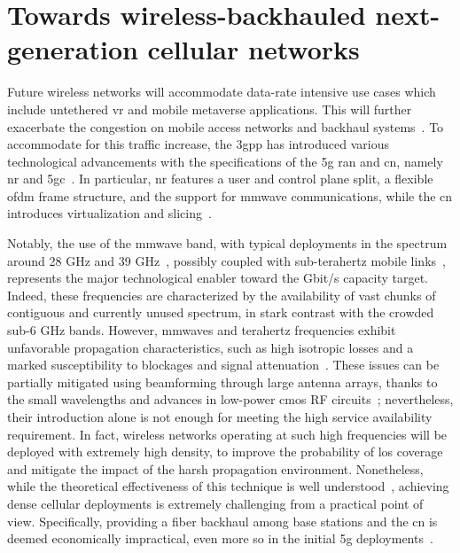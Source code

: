 \chapter{Towards wireless-backhauled next-generation cellular networks}
\label{ch:iab}


Future wireless networks will accommodate data-rate intensive use cases which include untethered \gls{vr} and mobile metaverse applications. This will further exacerbate the congestion on mobile access networks and backhaul systems~\cite{holo1}.
To accommodate for this traffic increase, the \gls{3gpp} has introduced various technological advancements with the specifications of the \gls{5g} \gls{ran} and \gls{cn}, namely \gls{nr} and \gls{5gc}~\cite{3gpp_38_300}. In particular, \gls{nr} features a user and control plane split, a flexible \gls{ofdm} frame structure, and the support for \gls{mmwave} communications, while the \gls{cn} introduces virtualization and slicing~\cite{yousaf2017nfv}. 

Notably, the use of the \gls{mmwave} band, with typical deployments in the spectrum around 28 GHz and 39 GHz~\cite{shafi2017deployment}, possibly coupled with sub-terahertz mobile links~\cite{polese2020toward, 8869705}, represents the major technological enabler toward the Gbit/s capacity target. Indeed, these frequencies are characterized by the availability of vast chunks of contiguous and currently unused spectrum, in stark contrast with the crowded sub-6 GHz bands. 
However, \glspl{mmwave} and terahertz frequencies exhibit unfavorable propagation characteristics, such as high isotropic losses and a marked susceptibility to blockages and signal attenuation~\cite{khan2011mmwave, rangan2014millimeter}.
These issues can be partially mitigated using beamforming through large antenna arrays, thanks to the small wavelengths and advances in low-power \gls{cmos} RF circuits~\cite{hemadeh2017millimeter}; nevertheless, their introduction alone is not enough for meeting the high service availability requirement. 
In fact, wireless networks operating at such high frequencies will be deployed with extremely high density, to improve the probability of \gls{los} coverage and mitigate the impact of the harsh propagation environment. 
Nonetheless, while the theoretical effectiveness of this technique is well understood~\cite{gomez2017capacity}, achieving dense cellular deployments is extremely challenging from a practical point of view. Specifically, providing a fiber backhaul among base stations and the \gls{cn} is deemed economically impractical, even more so in the initial \gls{5g} deployments~\cite{polese2020integrated}.

